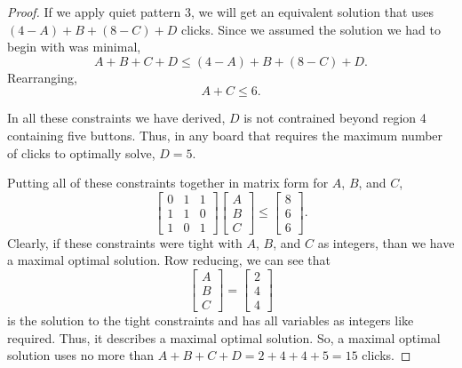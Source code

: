 \documentclass{article}
\begin{document}
\begin{proof}
		If we apply quiet pattern 3, we will get an equivalent solution that uses $(4 - A) + B + (8 - C) + D$ clicks.
		Since we assumed the solution we had to begin with was minimal,
		\begin{equation*}
			A + B + C + D \leq (4 - A) + B + (8 - C) + D.
		\end{equation*}
		Rearranging,
		\begin{equation}
			A + C \leq 6.
		\end{equation}
	
		In all these constraints we have derived, $D$ is not contrained beyond region 4 containing five buttons.
		Thus, in any board that requires the maximum number of clicks to optimally solve, $D = 5$.
	
		Putting all of these constraints together in matrix form for $A$, $B$, and $C$,
		\begin{equation}
			\begin{bmatrix}
				0 & 1 & 1 \\
				1 & 1 & 0 \\
				1 & 0 & 1
			\end{bmatrix}
			\begin{bmatrix}
				A \\
				B \\
				C
			\end{bmatrix}
			\leq
			\begin{bmatrix}
				8 \\
				6 \\
				6
			\end{bmatrix}.
		\end{equation}
		Clearly, if these constraints were tight with $A$, $B$, and $C$ as integers, than we have a maximal optimal solution.
		Row reducing, we can see that
		\begin{equation*}
			\begin{bmatrix}
				A \\
				B \\
				C
			\end{bmatrix}
			=
			\begin{bmatrix}
				2 \\
				4 \\
				4
			\end{bmatrix}
		\end{equation*}
		is the solution to the tight constraints and has all variables as integers like required.
		Thus, it describes a maximal optimal solution.
		So, a maximal optimal solution uses no more than $A + B + C + D = 2 + 4 + 4 + 5 = 15$ clicks.
	\end{proof}
\end{document}
